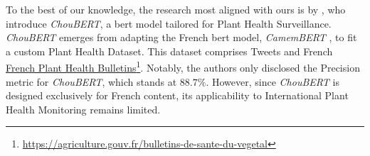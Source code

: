 To the best of our knowledge, the research most aligned with ours is by , who introduce \emph{ChouBERT}, a \gls{bert} model tailored for Plant Health Surveillance. \emph{ChouBERT} emerges from adapting the French \gls{bert} model, \emph{CamemBERT} , to fit a custom Plant Health Dataset. This dataset comprises Tweets and French \href{https://agriculture.gouv.fr/bulletins-de-sante-du-vegetal}{French Plant Health Bulletins}\footnote{\url{https://agriculture.gouv.fr/bulletins-de-sante-du-vegetal}}. Notably, the authors only disclosed the Precision metric for \emph{ChouBERT}, which stands at $88.7\%$. However, since \emph{ChouBERT} is designed exclusively for French content, its applicability to International Plant Health Monitoring remains limited.